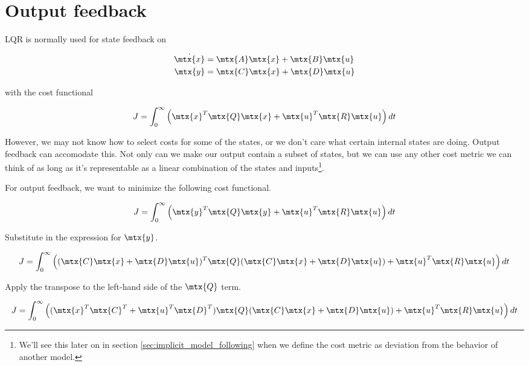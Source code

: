 \section{Output feedback}

LQR is normally used for state feedback on

\begin{align*}
  \dot{\mtx{x}} &= \mtx{A}\mtx{x} + \mtx{B}\mtx{u} \\
  \mtx{y} &= \mtx{C}\mtx{x} + \mtx{D}\mtx{u}
\end{align*}

with the cost functional

\begin{equation*}
  J = \int_0^\infty \left(\mtx{x}^T\mtx{Q}\mtx{x} +
    \mtx{u}^T\mtx{R}\mtx{u}\right) dt
\end{equation*}

However, we may not know how to select costs for some of the states, or we don't
care what certain internal states are doing. Output feedback can accomodate
this. Not only can we make our output contain a subset of states, but we can use
any other cost metric we can think of as long as it's representable as a linear
combination of the states and inputs\footnote{We'll see this later on in section
\ref{sec:implicit_model_following} when we define the cost metric as deviation
from the behavior of another model.}.

For output feedback, we want to minimize the following cost functional.

\begin{equation*}
  J = \int_0^\infty \left(\mtx{y}^T\mtx{Q}\mtx{y} +
    \mtx{u}^T\mtx{R}\mtx{u}\right) dt
\end{equation*}

Substitute in the expression for $\mtx{y}$.

\begin{equation*}
  J = \int_0^\infty \left((\mtx{C}\mtx{x} + \mtx{D}\mtx{u})^T\mtx{Q}
    (\mtx{C}\mtx{x} + \mtx{D}\mtx{u}) + \mtx{u}^T\mtx{R}\mtx{u}\right) dt
\end{equation*}

Apply the transpose to the left-hand side of the $\mtx{Q}$ term.

\begin{equation*}
  J = \int_0^\infty \left((\mtx{x}^T\mtx{C}^T + \mtx{u}^T\mtx{D}^T)\mtx{Q}
    (\mtx{C}\mtx{x} + \mtx{D}\mtx{u}) + \mtx{u}^T\mtx{R}\mtx{u}\right) dt
\end{equation*}

